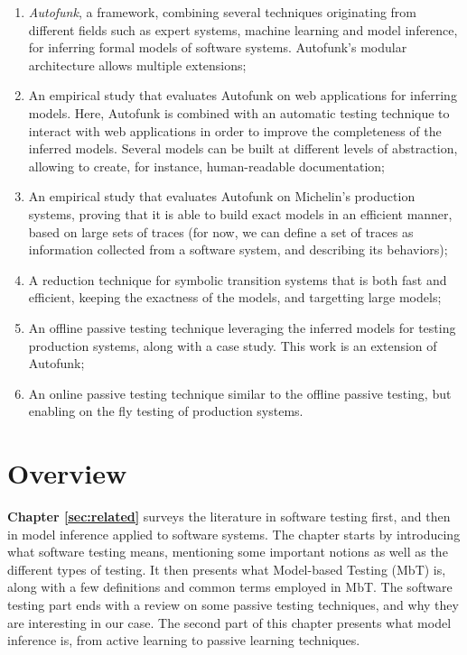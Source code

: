 \begin{enumerate}
    \item \textit{Autofunk}, a framework, combining several
        techniques originating from different fields such as
        expert systems, machine learning and model inference, for
        inferring formal models of software systems. Autofunk's
        modular architecture allows multiple extensions;

    \item An empirical study that evaluates Autofunk on web
        applications for inferring models. Here, Autofunk is
        combined with an automatic testing technique to interact
        with web applications in order to improve the
        completeness of the inferred models. Several models can
        be built at different levels of abstraction, allowing to
        create, for instance, human-readable documentation;

    \item An empirical study that evaluates Autofunk on
        Michelin's production systems, proving that it is able to
        build exact models in an efficient manner, based on large
        sets of traces (for now, we can define a set of traces as
        information collected from a software system, and
        describing its behaviors);

    \item A reduction technique for symbolic transition systems
        that is both fast and efficient, keeping the exactness of
        the models, and targetting large models;

    \item An offline passive testing technique leveraging the
        inferred models for testing production systems, along
        with a case study. This work is an extension of Autofunk;

    \item An online passive testing technique similar to the
        offline passive testing, but enabling on the fly testing
        of production systems.
\end{enumerate}


\section{Overview}

\textbf{Chapter \ref{sec:related}} surveys the literature in
software testing first, and then in model inference applied to
software systems. The chapter starts by introducing what software
testing means, mentioning some important notions as well as the
different types of testing. It then presents what Model-based
Testing (MbT) is, along with a few definitions and common terms
employed in MbT. The software testing part ends with a review on
some passive testing techniques, and why they are interesting in
our case. The second part of this chapter presents what model
inference is, from active learning to passive learning
techniques.

